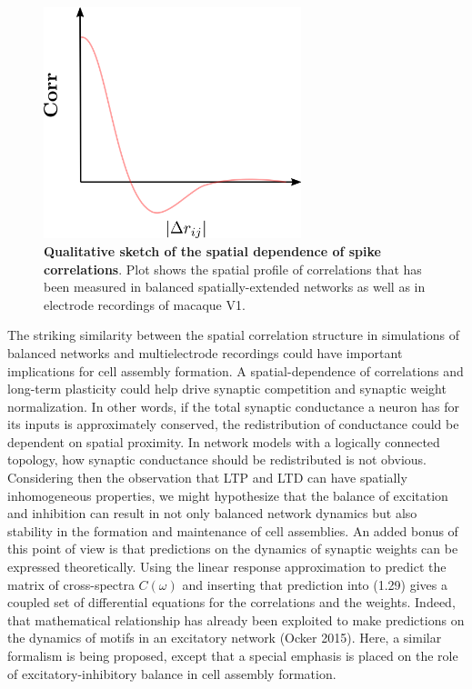\documentclass{ucetd}
\begin{document}
\begin{figure}[t!]
\centering
\includegraphics[width=75mm]{figure-10}
\caption{\textbf{Qualitative sketch of the spatial dependence of spike correlations}. Plot shows the spatial profile of correlations that has been measured in balanced spatially-extended networks as well as in electrode recordings of macaque V1.}
\end{figure}

The striking similarity between the spatial correlation structure in simulations of balanced networks and multielectrode recordings could have important implications for cell assembly formation. A spatial-dependence of correlations and long-term plasticity could help drive synaptic competition and synaptic weight normalization. In other words, if the total synaptic conductance a neuron has for its inputs is approximately conserved, the redistribution of conductance could be dependent on spatial proximity. In network models with a logically connected topology, how synaptic conductance should be redistributed is not obvious. Considering then the observation that LTP and LTD can have spatially inhomogeneous properties, we might hypothesize that the balance of excitation and inhibition can result in not only balanced network dynamics but also stability in the formation and maintenance of cell assemblies. An added bonus of this point of view is that predictions on the dynamics of synaptic weights can be expressed theoretically. Using the linear response approximation to predict the matrix of cross-spectra $C(\omega)$ and inserting that prediction into (1.29) gives a coupled set of differential equations for the correlations and the weights. Indeed, that mathematical relationship has already been exploited to make predictions on the dynamics of motifs in an excitatory network (Ocker 2015). Here, a similar formalism is being proposed, except that a special emphasis is placed on the role of excitatory-inhibitory balance in cell assembly formation. 
\end{document}
